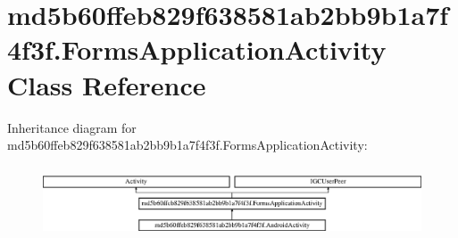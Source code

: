 \hypertarget{classmd5b60ffeb829f638581ab2bb9b1a7f4f3f_1_1FormsApplicationActivity}{}\section{md5b60ffeb829f638581ab2bb9b1a7f4f3f.\+Forms\+Application\+Activity Class Reference}
\label{classmd5b60ffeb829f638581ab2bb9b1a7f4f3f_1_1FormsApplicationActivity}
Inheritance diagram for md5b60ffeb829f638581ab2bb9b1a7f4f3f.\+Forms\+Application\+Activity\+:\begin{figure}[H]
\begin{center}
\leavevmode
\includegraphics[height=2.137405cm]{classmd5b60ffeb829f638581ab2bb9b1a7f4f3f_1_1FormsApplicationActivity}
\end{center}
\end{figure}
